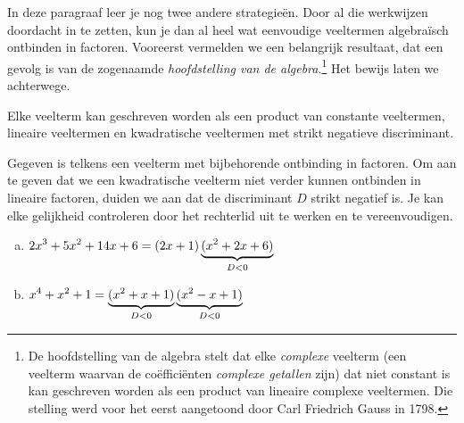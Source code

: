\documentclass{ximera}
\begin{document}
In deze paragraaf leer je nog twee andere strategie\"en. Door al die werkwijzen doordacht in te zetten, kun je dan al heel wat eenvoudige veeltermen algebra\"isch ontbinden in factoren. Vooreerst vermelden we een belangrijk resultaat, dat een gevolg is van de zogenaamde {\em hoofdstelling van de algebra}.\footnote{De hoofdstelling van de algebra stelt dat elke {\em complexe} veelterm (een veelterm waarvan de co\"effici\"enten {\em complexe getallen} zijn) dat niet constant is kan geschreven worden als een product van lineaire complexe veeltermen. Die stelling werd voor het eerst aangetoond door Carl Friedrich Gauss in 1798.} Het bewijs laten we achterwege.

\begin{stelling}\label{stelling:ontbinden}
Elke veelterm kan geschreven worden als een product van constante veeltermen, lineaire veel\-termen en kwadratische veeltermen met strikt negatieve discriminant.
\end{stelling}

\begin{voorbeeld}
Gegeven is telkens een veelterm met bijbehorende ontbinding in factoren. Om aan te geven dat we een kwadratische veelterm niet verder kunnen ontbinden in lineaire factoren, duiden we aan dat de discriminant $D$ strikt negatief is. Je kan elke gelijkheid controleren door het rechterlid uit te werken en te vereenvoudigen. 
\begin{enumerate}[(a)]
\item
$\displaystyle 2x^3 + 5x^2 + 14x + 6 = (2x+1)\underbrace{(x^2+2x+6)}_{D < 0}$
\item
$\displaystyle x^4+x^2+1 = \underbrace{(x^2+x+1)}_{D < 0}\underbrace{(x^2-x+1)}_{D < 0}$
\end{enumerate}
\end{voorbeeld}

\clearpage
\end{document}
